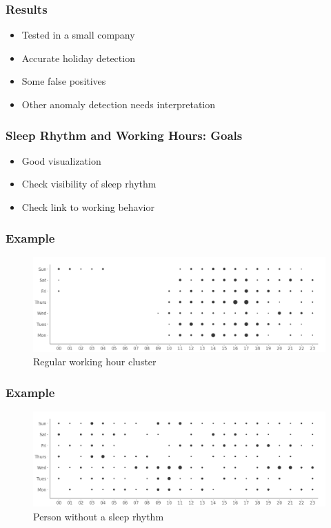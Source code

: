 \documentclass[t]{beamer}
\begin{document}
\begin{frame}
    \frametitle{Results}
    \vspace{1cm}
    \begin{itemize}
        \item Tested in a small company
        \pause{}
        \item Accurate holiday detection
        \pause{}
        \item Some false positives
        \pause{}
        \item Other anomaly detection needs interpretation
    \end{itemize}
\end{frame}

\begin{frame}
    \frametitle{Sleep Rhythm and Working Hours: Goals}
    \vspace{1cm}
    \begin{itemize}
        \item Good visualization
        \pause{}
        \item Check visibility of sleep rhythm
        \pause{}
        \item Check link to working behavior
    \end{itemize}
\end{frame}

\begin{frame}
    \frametitle{Example}
    \vspace{1cm}
    \begin{figure}[H]
        \includegraphics[scale=0.22]{analysis/ordered-punchcard}
        \centering
        \caption{Regular working hour cluster}
    \end{figure}
\end{frame}

\begin{frame}
    \frametitle{Example}
    \vspace{1cm}
    \begin{figure}[H]
        \includegraphics[scale=0.22]{analysis/random-punchcard}
        \centering
        \caption{Person without a sleep rhythm}
    \end{figure}
\end{frame}
\end{document}
